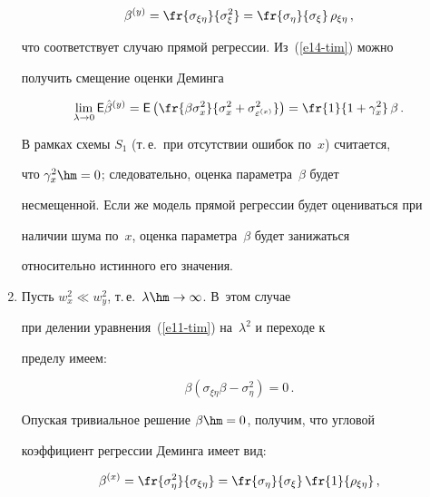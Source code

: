 \begin{multicols}{2}
\begin{enumerate}[1.]
\begin{equation}

\beta^{(y)} = \fr{\sigma_{\xi\eta}}{\sigma^2_\xi} =\fr{\sigma_\eta}

{\sigma_\xi}\,\rho_{\xi\eta}\,,

\label{e14-tim}

\end{equation}

что соответствует случаю прямой регрессии. Из~(\ref{e14-tim}) можно

получить смещение оценки Деминга

$$

\lim\limits_{\lambda\to 0} {\sf E} \hat{\beta}^{(y)} ={\sf E}\left( \fr{\beta \sigma_x^2}

{\sigma_x^2+\sigma^2_{\varepsilon^{(x)}}} \right) = \fr{1}

{1+\gamma_x^2}\,\beta\,.

$$



  В рамках схемы $S_1$ (т.\,е.\ при отсутствии ошибок по~$x$) считается,

что $\gamma_x^2\hm=0$; следовательно, оценка параметра~$\beta$ будет

несмещенной. Если же модель прямой регрессии будет оцениваться при

наличии шума по~$x$, оценка параметра~$\beta$ будет занижаться

относительно истинного его значения.

\item Пусть $w_x^2\ll w_y^2$, т.\,е.\ $\lambda\hm\to \infty$. В~этом случае

при делении уравнения~(\ref{e11-tim}) на~$\lambda^2$ и переходе к

пределу имеем:

$$

\beta \left( \sigma_{\xi\eta}\beta - \sigma_\eta^2\right) =0\,.

$$

Опуская тривиальное решение $\beta\hm=0$, получим, что угловой

коэффициент регрессии Деминга имеет вид:

\begin{equation}

\beta^{(x)} =\fr{\sigma^2_\eta}{\sigma_{\xi\eta}}=\fr{\sigma_\eta} {\sigma_\xi}\,

\fr{1}{\rho_{\xi\eta}}\,,

\label{e15-tim}


\end{equation}
\end{enumerate}
\end{multicols}
